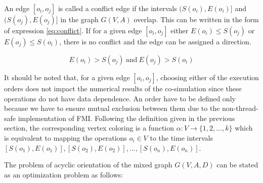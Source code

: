 An edge $[o_i,o_j]$ is called a conflict edge if the intervals $(S(o_i), E(o_i)]$ and $(S(o_j), E(o_j)]$ in the graph $G(V,A)$ overlap. This can be written in the form of expression \ref{eq:conflict}. If for a given edge $[o_i,o_j]$ either $E(o_i) \leq S(o_j)$ or $E(o_j) \leq S(o_i)$, there is no conflict and the edge can be assigned a direction. 

\begin{equation}
E(o_i) > S(o_j)\ \text{and}\ E(o_j) > S(o_i)
\label{eq:conflict}
\end{equation}

It should be noted that, for a given edge $[o_i, o_j]$, choosing either of the execution orders does not impact the numerical results of the co-simulation since these operations do not have data dependence. An order have to be defined only because we have to ensure mutual exclusion between them due to the non-thread-safe implementation of FMI. Following the definition given in the previous section, the corresponding vertex coloring is a function $\alpha: V \rightarrow \{1, 2, \ldots, k\}$ which is equivalent to mapping the operations $o_i \in V$ to the time intervals $[S(o_1), E(o_1)], [S(o_2), E(o_2)], \ldots, [S(o_n), E(o_n)]$.

The problem of acyclic orientation of the mixed graph $G(V,A,D)$ can be stated as an optimization problem as follows:


